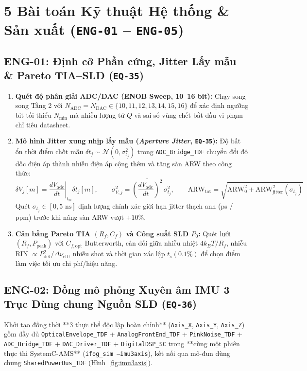 \documentclass[11pt, a4paper]{article}
\begin{document}
\section{5 Bài toán Kỹ thuật Hệ thống \& Sản xuất (\texttt{ENG-01} -- \texttt{ENG-05})}

\subsection{ENG-01: Định cỡ Phần cứng, Jitter Lấy mẫu \& Pareto TIA--SLD (\texttt{EQ-35})}
\begin{enumerate}
    \item \textbf{Quét độ phân giải ADC/DAC (ENOB Sweep, 10--16 bit):} Chạy song song Tầng 2 với $N_{\text{ADC}} = N_{\text{DAC}} \in \{10,11,12,13,14,15,16\}$ để xác định ngưỡng bit tối thiểu $N_{\min}$ mà nhiễu lượng tử $Q$ và sai số vùng chết bắt đầu vi phạm chỉ tiêu datasheet.
    \item \textbf{Mô hình Jitter xung nhịp lấy mẫu (\emph{Aperture Jitter}, \texttt{EQ-35}):} Độ bất ổn thời điểm chốt mẫu $\delta t_j \sim \mathcal{N}(0, \sigma_{t_j}^2)$ trong \texttt{ADC\_Bridge\_TDF} chuyển đổi độ dốc điện áp thành nhiễu điện áp cộng thêm và tăng sàn ARW theo công thức:
    \begin{equation}
    \delta V_j[m] = \left.\frac{dV_{\text{adc}}}{dt}\right|_{t_m}\delta t_j[m], \qquad
    \sigma_{V,j}^2 = \overline{\left(\frac{dV_{\text{adc}}}{dt}\right)^2}\,\sigma_{t_j}^2, \qquad
    \text{ARW}_{\text{tot}} = \sqrt{\text{ARW}_0^2 + \text{ARW}_{\text{jitter}}^2(\sigma_{t_j})}
    \label{eq:eq35_jitter}
    \end{equation}
    Quét $\sigma_{t_j} \in [0, 5\text{ ns}]$ định lượng chính xác giới hạn jitter thạch anh (ps / ppm) trước khi nâng sàn ARW vượt $+10\%$.
    \item \textbf{Cân bằng Pareto TIA $(R_f, C_f)$ và Công suất SLD $P_0$:} Quét lưới $(R_f, P_{\text{peak}})$ với $C_{f,\text{opt}}$ Butterworth, cân đối giữa nhiễu nhiệt $4k_B T / R_f$, nhiễu RIN $\propto P_{\text{det}}^2 / \Delta\nu_{\text{eff}}$, nhiễu shot và thời gian xác lập $t_s(0.1\%)$ để chọn điểm làm việc tối ưu chi phí/hiệu năng.
\end{enumerate}

\subsection{ENG-02: Đồng mô phỏng Xuyên âm IMU 3 Trục Dùng chung Nguồn SLD (\texttt{EQ-36})}
Khởi tạo đồng thời **3 thực thể độc lập hoàn chỉnh** (\texttt{Axis\_X}, \texttt{Axis\_Y}, \texttt{Axis\_Z}) gồm đầy đủ \texttt{OpticalEnvelope\_TDF} + \texttt{AnalogFrontEnd\_TDF} + \texttt{PinkNoise\_TDF} + \texttt{ADC\_Bridge\_TDF} + \texttt{DAC\_Driver\_TDF} + \texttt{DigitalDSP\_SC} trong **cùng một phiên thực thi SystemC-AMS** (\texttt{ifog\_sim --imu3axis}), kết nối qua mô-đun dùng chung \texttt{SharedPowerBus\_TDF} (Hình~\ref{fig:imu3axis}).
\end{document}
